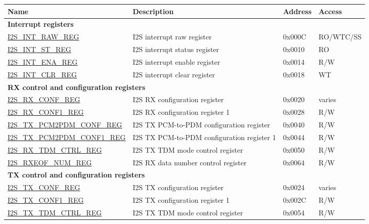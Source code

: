 \begin{longtable}{ | p{5cm} | p{7.2cm} | p{1.3cm} | p{2cm} | }
\hline\rowcolor{lightgray}
\textbf{Name} & \textbf{Description} &  \textbf{Address} & \textbf{Access} \\ \hline
\endhead
\multicolumn{4}{|l|}{\textbf{Interrupt registers}} \\ \hline
\hyperref[regdesc:I2SINTRAWREG]{I2S\_INT\_RAW\_REG} & I2S interrupt raw register  & 0x000C & RO/WTC/SS \\ \hline
\hyperref[regdesc:I2SINTSTREG]{I2S\_INT\_ST\_REG} & I2S interrupt status register & 0x0010 & RO \\ \hline
\hyperref[regdesc:I2SINTENAREG]{I2S\_INT\_ENA\_REG} & I2S interrupt enable register & 0x0014 & R/W \\ \hline
\hyperref[regdesc:I2SINTCLRREG]{I2S\_INT\_CLR\_REG} & I2S interrupt clear register & 0x0018 & WT \\ \hline
\multicolumn{4}{|l|}{\textbf{RX control and configuration registers}} \\ \hline
\hyperref[regdesc:I2SRXCONFREG]{I2S\_RX\_CONF\_REG} & I2S RX configuration register & 0x0020 & varies \\ \hline
\hyperref[regdesc:I2SRXCONF1REG]{I2S\_RX\_CONF1\_REG} & I2S RX configuration register 1 & 0x0028 & R/W \\ \hline
\hyperref[regdesc:I2STXPCM2PDMCONFREG]{I2S\_TX\_PCM2PDM\_CONF\_REG} & I2S TX PCM-to-PDM configuration register & 0x0040 & R/W \\ \hline
\hyperref[regdesc:I2STXPCM2PDMCONF1REG]{I2S\_TX\_PCM2PDM\_CONF1\_REG} & I2S TX PCM-to-PDM configuration register 1 & 0x0044 & R/W \\ \hline
\hyperref[regdesc:I2SRXTDMCTRLREG]{I2S\_RX\_TDM\_CTRL\_REG} & I2S TX TDM mode control register & 0x0050 & R/W \\ \hline
\hyperref[regdesc:I2SRXEOFNUMREG]{I2S\_RXEOF\_NUM\_REG} & I2S RX data number control register & 0x0064 & R/W \\ \hline
\multicolumn{4}{|l|}{\textbf{TX control and configuration registers}} \\ \hline
\hyperref[regdesc:I2STXCONFREG]{I2S\_TX\_CONF\_REG} & I2S TX configuration register & 0x0024 & varies \\ \hline
\hyperref[regdesc:I2STXCONF1REG]{I2S\_TX\_CONF1\_REG} & I2S TX configuration register 1 & 0x002C & R/W \\ \hline
\hyperref[regdesc:I2STXTDMCTRLREG]{I2S\_TX\_TDM\_CTRL\_REG} & I2S TX TDM mode control register & 0x0054 & R/W \\ \hline

\end{longtable}
